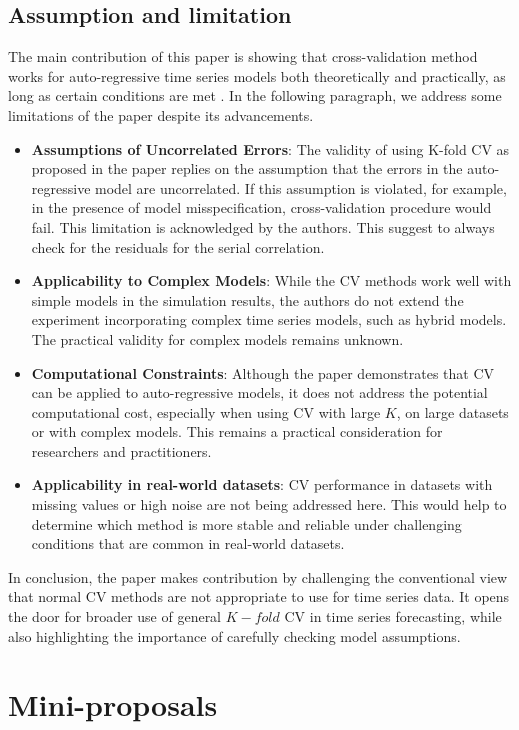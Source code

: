 \documentclass[12pt, oneside]{amsart}
\theoremstyle{definition}
\theoremstyle{remark}
\numberwithin{equation}{section}
\begin{document}
\subsection{Assumption and limitation} 
The main contribution of this paper is showing that cross-validation method works for auto-regressive time series models both theoretically and practically, as long as certain conditions are met \citep{Bergmeir2018}. In the following paragraph, we address some limitations of the paper despite its advancements. 
\begin{itemize}
    \item \textbf{Assumptions of Uncorrelated Errors}: The validity of using K-fold CV as proposed in the paper replies on the assumption that the errors in the auto-regressive model are uncorrelated. If this assumption is violated, for example, in the presence of model misspecification, cross-validation procedure would fail. This limitation is acknowledged by the authors. This suggest to always check for the residuals for the serial correlation. 
    \item \textbf{Applicability to Complex Models}: While the CV methods work well with simple models in the simulation results, the authors do not extend the experiment incorporating complex time series models, such as hybrid models. The practical validity for complex models remains unknown. 
    \item \textbf{Computational Constraints}: Although the paper demonstrates that CV can be applied to auto-regressive models, it does not address the potential computational cost, especially when using CV with large $K$, on large datasets or with complex models. This remains a practical consideration for researchers and practitioners.
    \item \textbf{Applicability in real-world datasets}: CV performance in datasets with missing values or high noise are not being addressed here. This would help to determine which method is more stable and reliable under challenging conditions that are common in real-world datasets.
\end{itemize}
In conclusion, the paper makes contribution by challenging the conventional view that normal CV methods are not appropriate to use for time series data. It opens the door for broader use of general $K-fold$ CV in time series forecasting, while also highlighting the importance of carefully checking model assumptions.
\section{Mini-proposals}
\end{document}
